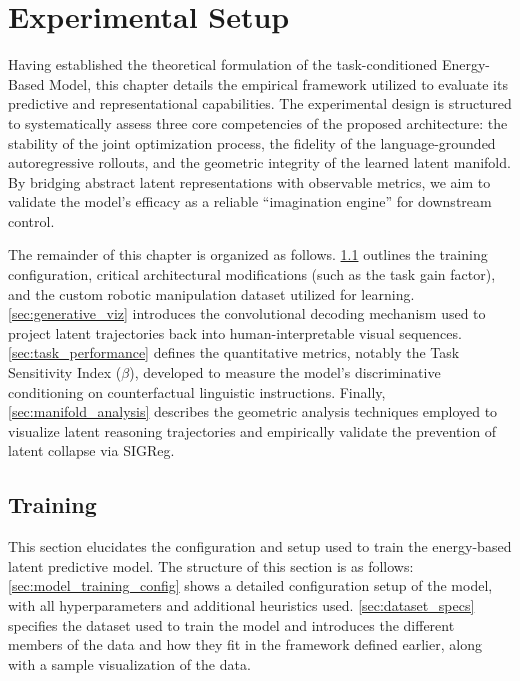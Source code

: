 \chapter{Experimental Setup}
\label{sec:experiments}


Having established the theoretical formulation of the task-conditioned Energy-Based Model, this chapter details the empirical framework utilized to evaluate its predictive and representational capabilities. The experimental design is structured to systematically assess three core competencies of the proposed architecture: the stability of the joint optimization process, the fidelity of the language-grounded autoregressive rollouts, and the geometric integrity of the learned latent manifold. By bridging abstract latent representations with observable metrics, we aim to validate the model's efficacy as a reliable ``imagination engine'' for downstream control.

The remainder of this chapter is organized as follows. \cref{sec:training_setup} outlines the training configuration, critical architectural modifications (such as the task gain factor), and the custom robotic manipulation dataset utilized for learning. \cref{sec:generative_viz} introduces the convolutional decoding mechanism used to project latent trajectories back into human-interpretable visual sequences. \cref{sec:task_performance} defines the quantitative metrics, notably the Task Sensitivity Index ($\beta$), developed to measure the model's discriminative conditioning on counterfactual linguistic instructions. Finally, \cref{sec:manifold_analysis} describes the geometric analysis techniques employed to visualize latent reasoning trajectories and empirically validate the prevention of latent collapse via SIGReg.

\section{Training}
\label{sec:training_setup}

This section elucidates the configuration and setup used to train the energy-based latent predictive model. The structure of this section is as follows: \cref{sec:model_training_config} shows a detailed configuration setup of the model, with all hyperparameters and additional heuristics used. \cref{sec:dataset_specs} specifies the dataset used to train the model and introduces the different members of the data and how they fit in the framework defined earlier, along with a sample visualization of the data.

